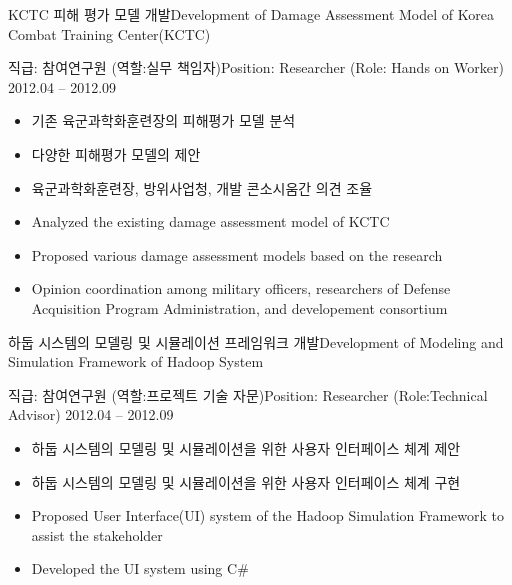 \documentclass[english,full]{resume_structure}
\begin{document}
\begin{Project}
{KCTC 피해 평가 모델 개발}{Development of Damage Assessment Model of Korea Combat Training Center(KCTC)}
{}{} 
{
\ResumeSubSection %
    {직급: 참여연구원 (역할:실무 책임자)}{Position: Researcher (Role: Hands on Worker)}
    {2012.04 -- 2012.09}
    {
      \begin{itemize}
        \item 기존 육군과학화훈련장의 피해평가 모델 분석
        \item 다양한 피해평가 모델의 제안
        \item 육군과학화훈련장, 방위사업청, 개발 콘소시움간 의견 조율
      \end{itemize}
    }
    {
      \begin{itemize}
        \item Analyzed the existing damage assessment model of KCTC
        \item Proposed various damage assessment models based on the research
        \item Opinion coordination among military officers, researchers of Defense Acquisition Program Administration, and developement consortium
      \end{itemize}
    }
}

{하둡 시스템의 모델링 및 시뮬레이션 프레임워크 개발}{Development of Modeling and Simulation Framework of Hadoop System}
{}{} 
{
\ResumeSubSection %
    {직급: 참여연구원 (역할:프로젝트 기술 자문)}{Position: Researcher (Role:Technical Advisor)}
    {2012.04 -- 2012.09}
    {
      \begin{itemize}
        \item 하둡 시스템의 모델링 및 시뮬레이션을 위한 사용자 인터페이스 체계 제안
        \item 하둡 시스템의 모델링 및 시뮬레이션을 위한 사용자 인터페이스 체계 구현
      \end{itemize}
    }
    {
      \begin{itemize}
        \item Proposed User Interface(UI) system of the Hadoop Simulation Framework to assist the stakeholder
        \item Developed the UI system using C\#
      \end{itemize}
    }
}


\end{Project}
\end{document}
